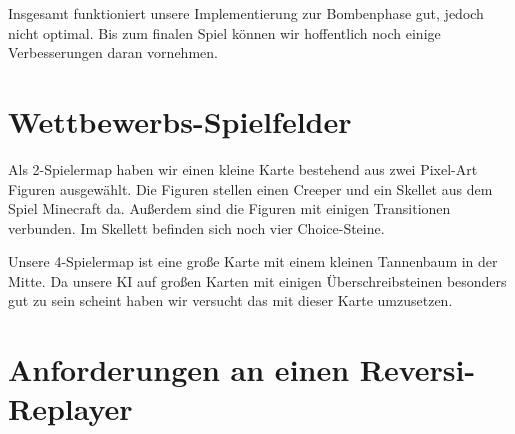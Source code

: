 \documentclass[12pt,a4paper,bibliography=totocnumbered,listof=totocnumbered]{scrartcl}
\begin{document}
	Insgesamt funktioniert unsere Implementierung zur Bombenphase gut, jedoch nicht optimal. Bis zum finalen Spiel können wir hoffentlich noch einige Verbesserungen daran vornehmen.

    
    \section{Wettbewerbs-Spielfelder}
    \vspace{1em}

	Als 2-Spielermap haben wir einen kleine Karte bestehend aus zwei Pixel-Art Figuren ausgewählt. Die Figuren stellen einen Creeper und ein Skellet aus dem Spiel Minecraft da. Außerdem sind die Figuren mit einigen Transitionen verbunden. Im Skellett befinden sich noch vier Choice-Steine.
	
	Unsere 4-Spielermap ist eine große Karte mit einem kleinen Tannenbaum in der Mitte. Da unsere KI auf großen Karten mit einigen Überschreibsteinen besonders gut zu sein scheint haben wir versucht das mit dieser Karte umzusetzen.
	
	\section{Anforderungen an einen Reversi-Replayer}
	\vspace{1em}
	
\end{document}
